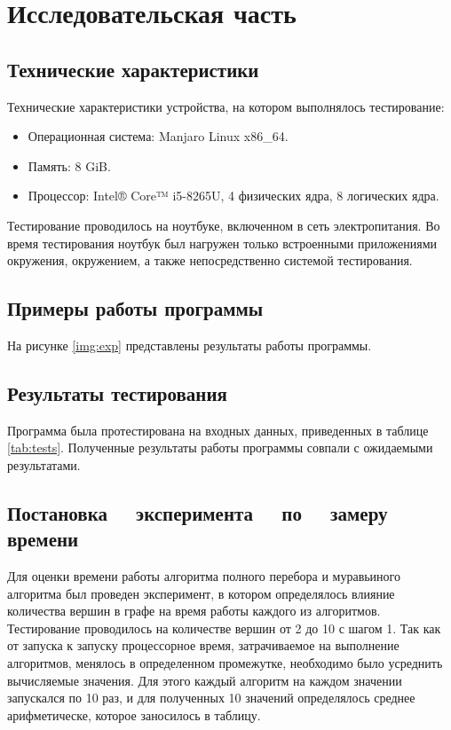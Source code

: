 \chapter{Исследовательская часть}

\section{Технические характеристики}

Технические характеристики устройства, на котором выполнялось тестирование:

\begin{itemize}
	\item Операционная система: Manjaro \cite{manjaro} Linux x86\_64.
	\item Память: 8 GiB.
    \item Процессор: Intel® Core™ i5-8265U, 4 физических ядра, 8 логических
        ядра\cite{intel}.
\end{itemize}

Тестирование проводилось на ноутбуке, включенном в сеть электропитания. Во
время тестирования ноутбук был нагружен только встроенными приложениями
окружения, окружением, а также непосредственно системой тестирования.

\section{Примеры работы программы}

На рисунке \ref{img:exp} представлены результаты работы программы.


\section{Результаты тестирования}

Программа была протестирована на входных данных, приведенных в таблице
\ref{tab:tests}. Полученные результаты работы программы совпали с ожидаемыми
результатами.

\section[Постановка эксперимента по замеру времени]
        {Постановка ~~эксперимента ~~по ~~замеру времени}

Для оценки времени работы алгоритма полного перебора и муравьиного алгоритма
был проведен эксперимент, в котором определялось влияние количества вершин в
графе на время работы каждого из алгоритмов. Тестирование проводилось на
количестве вершин от 2 до 10 с шагом 1. Так как от запуска к запуску
процессорное время, затрачиваемое на выполнение алгоритмов, менялось в
определенном промежутке, необходимо было усреднить вычисляемые значения. Для
этого каждый алгоритм на каждом значении запускался по 10 раз, и для полученных
10 значений определялось среднее арифметическе, которое заносилось в таблицу.

